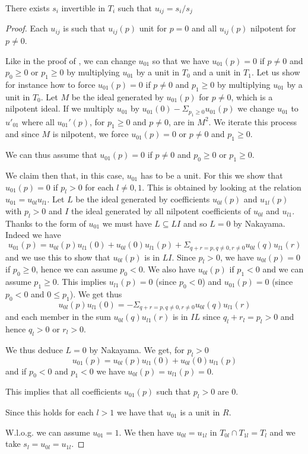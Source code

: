 \begin{proposition}
  There exists $s_i$ invertible in $T_i$ such that $u_{ij} = s_i/s_j$ 
\end{proposition}

\begin{proof}
  Each $u_{ij}$ is such that $u_{ij}(p)$ unit for $p=0$ and
  all $u_{ij}(p)$ nilpotent for $p\neq 0$.

  Like in the proof of , we can change $u_{01}$ so that
  we have $u_{01}(p) = 0$ if $p\neq 0$ and $p_0\geqslant 0$ or $p_1\geqslant 0$ by multiplying $u_{01}$ by a unit in $T_0$ and
  a unit in $T_1$. Let us show for instance how to force $u_{01}(p) = 0$ if $p\neq 0$ and $p_1\geqslant 0$ by multiplying $u_{01}$
  by a unit in $T_0$. Let $M$ be the ideal generated by $u_{01}(p)$ for $p\neq 0$, which is a nilpotent ideal. If we
  multiply $u_{01}$ by $u_{01}(0) - \Sigma_{p_1\geqslant 0} u_{01}(p)$
  we change $u_{01}$ to $u'_{01}$ where all $u_{01}'(p)$, for $p_1\geqslant 0$ and $p\neq 0$, are in $M^2$. We iterate this process
  and since $M$ is nilpotent, we force $u_{01}(p) = 0$ or $p\neq 0$ and $p_1\geqslant 0$.

  We can thus assume that $u_{01}(p) = 0$ if $p\neq 0$ and $p_0\geqslant 0$ or $p_1\geqslant 0$.
  
  We claim then that, in this case, $u_{01}$ has to be a unit. For this we show that $u_{01}(p) = 0$
  if $p_l>0$ for each $l\neq 0,1$. 
  This is obtained by looking at the relation $u_{01}= u_{0l}u_{l1}$. Let $L$ be the ideal generated by
  coefficients $u_{0l}(p)$ and $u_{1l}(p)$ with $p_l>0$ and $I$
  the ideal generated by all nilpotent coefficients of $u_{0l}$ and $u_{l1}$.
  Thanks to the form of $u_{01}$ we must have $L\subseteq LI$ and so $L=0$ by Nakayama. Indeed we have
  $$u_{01}(p) = u_{0l}(p)u_{l1}(0) + u_{0l}(0)u_{l1}(p) + \Sigma_{q+r = p, q\neq 0, r\neq 0}u_{0l}(q)u_{l1}(r)$$
  and we use this to show that $u_{0l}(p)$ is in $LI$.
  Since $p_l>0$, we have $u_{0l}(p) = 0$ if $p_0\geqslant 0$, hence we can assume $p_0<0$.
  We also have $u_{0l}(p)$ if $p_1<0$ and we can assume $p_1\geqslant 0$.
  This implies $u_{l1}(p) = 0$ (since $p_0<0$) and $u_{01}(p) = 0$ (since $p_0<0$ and $0\leqslant p_1$).
  We get thus
  $$u_{0l}(p)u_{l1}(0) = - \Sigma_{q+r = p, q\neq 0, r\neq 0}u_{0l}(q)u_{l1}(r)$$
  and each member in the sum $u_{0l}(q)u_{l1}(r)$ is in $IL$ since $q_l+r_l = p_l>0$ and hence $q_l>0$ or $r_l>0$.

  We thus deduce $L=0$ by Nakayama. We get, for $p_l>0$
  $$u_{01}(p) = u_{0l}(p)u_{l1}(0) + u_{0l}(0)u_{l1}(p)$$
  and if $p_0<0$ and $p_1<0$ we have $u_{0l}(p) = u_{l1}(p) = 0$.

  This implies that all coefficients $u_{01}(p)$ such that $p_l>0$ are $0$.

  Since this holds for each $l>1$ we have that $u_{01}$ is a unit in $R$.

  W.l.o.g. we can assume $u_{01}= 1$. We then have $u_{0l} = u_{1l}$ in $T_{0l}\cap T_{1l} = T_l$
  and we take $s_l = u_{0l} = u_{1l}$.
\end{proof}

